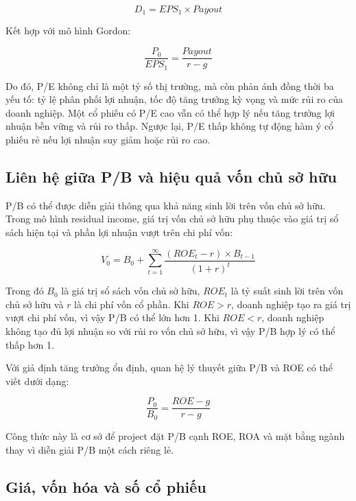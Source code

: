 \documentclass[12pt,a4paper]{article}
\begin{document}
\begin{equation}
    D_1 = EPS_1 \times Payout
\end{equation}

Kết hợp với mô hình Gordon:

\begin{equation}
    \frac{P_0}{EPS_1} = \frac{Payout}{r-g}
\end{equation}

Do đó, P/E không chỉ là một tỷ số thị trường, mà còn phản ánh đồng thời ba yếu tố: tỷ lệ phân phối lợi nhuận, tốc độ tăng trưởng kỳ vọng và mức rủi ro của doanh nghiệp. Một cổ phiếu có P/E cao vẫn có thể hợp lý nếu tăng trưởng lợi nhuận bền vững và rủi ro thấp. Ngược lại, P/E thấp không tự động hàm ý cổ phiếu rẻ nếu lợi nhuận suy giảm hoặc rủi ro cao.

\subsection{Liên hệ giữa P/B và hiệu quả vốn chủ sở hữu}

P/B có thể được diễn giải thông qua khả năng sinh lời trên vốn chủ sở hữu. Trong mô hình residual income, giá trị vốn chủ sở hữu phụ thuộc vào giá trị sổ sách hiện tại và phần lợi nhuận vượt trên chi phí vốn:

\begin{equation}
    V_0 = B_0 + \sum_{t=1}^{\infty}
    \frac{(ROE_t-r) \times B_{t-1}}{(1+r)^t}
\end{equation}

Trong đó $B_0$ là giá trị sổ sách vốn chủ sở hữu, $ROE_t$ là tỷ suất sinh lời trên vốn chủ sở hữu và $r$ là chi phí vốn cổ phần. Khi $ROE > r$, doanh nghiệp tạo ra giá trị vượt chi phí vốn, vì vậy P/B có thể lớn hơn 1. Khi $ROE < r$, doanh nghiệp không tạo đủ lợi nhuận so với rủi ro vốn chủ sở hữu, vì vậy P/B hợp lý có thể thấp hơn 1.

Với giả định tăng trưởng ổn định, quan hệ lý thuyết giữa P/B và ROE có thể viết dưới dạng:

\begin{equation}
    \frac{P_0}{B_0} = \frac{ROE-g}{r-g}
\end{equation}

Công thức này là cơ sở để project đặt P/B cạnh ROE, ROA và mặt bằng ngành thay vì diễn giải P/B một cách riêng lẻ.

\subsection{Giá, vốn hóa và số cổ phiếu}
\end{document}
